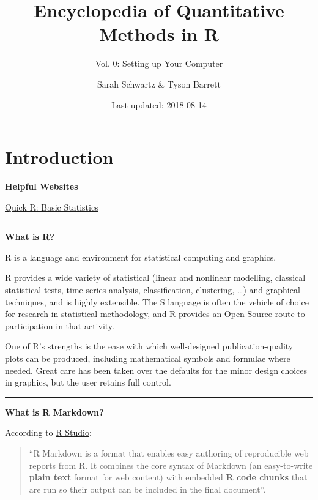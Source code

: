 \documentclass[]{book}
\title{Encyclopedia of Quantitative Methods in R}
\subtitle{Vol. 0: Setting up Your Computer}
\author{Sarah Schwartz \& Tyson Barrett}
\date{Last updated: 2018-08-14}
\theoremstyle{definition}
\theoremstyle{definition}
\theoremstyle{definition}
\theoremstyle{remark}
\begin{document}
\maketitle

{
\setcounter{tocdepth}{1}
\tableofcontents
}
\chapter*{Introduction}\label{introduction}

\textbf{Helpful Websites}

\href{https://www.statmethods.net/stats/index.html}{Quick R: Basic
Statistics}

\begin{center}\rule{0.5\linewidth}{\linethickness}\end{center}

\textbf{What is R?}

R is a language and environment for statistical computing and graphics.
\citep{R-base}

R provides a wide variety of statistical (linear and nonlinear
modelling, classical statistical tests, time-series analysis,
classification, clustering, \ldots{}) and graphical techniques, and is
highly extensible. The S language is often the vehicle of choice for
research in statistical methodology, and R provides an Open Source route
to participation in that activity.

One of R's strengths is the ease with which well-designed
publication-quality plots can be produced, including mathematical
symbols and formulae where needed. Great care has been taken over the
defaults for the minor design choices in graphics, but the user retains
full control.

\begin{center}\rule{0.5\linewidth}{\linethickness}\end{center}

\textbf{What is R Markdown?}

According to \href{www.rstudio.com}{R Studio}:

\begin{quote}
``R Markdown is a format that enables easy authoring of reproducible web
reports from R. It combines the core syntax of Markdown (an
easy-to-write \textbf{plain text} format for web content) with embedded
\textbf{R code chunks} that are run so their output can be included in
the final document''.
\end{quote}
\end{document}
